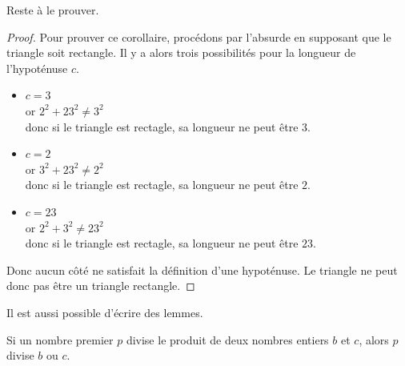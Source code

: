 \documentclass[francais,RandD]{rapportPFE}
\begin{document}
			Reste à le prouver.
			\begin{proof}
				Pour prouver ce corollaire, procédons par l'absurde en supposant que le triangle soit rectangle. Il y a alors trois possibilités pour la longueur de l'hypoténuse $c$.
				\begin{itemize}
					\item $c=3$\\
					or $2^{2}+ 23^{2} \neq 3^{2}$\\
					donc si le triangle est rectagle, sa longueur ne peut être $3$.
					\item $c=2$\\
					or $3^{2}+ 23^{2} \neq 2^{2}$\\
					donc si le triangle est rectagle, sa longueur ne peut être $2$.
					\item $c=23$\\
					or $2^{2}+ 3^{2} \neq 23^{2}$\\
					donc si le triangle est rectagle, sa longueur ne peut être $23$.
				\end{itemize}
				Donc aucun côté ne satisfait la définition d'une hypoténuse. Le triangle ne peut donc pas être un triangle rectangle.
			\end{proof}
			Il est aussi possible d'écrire des lemmes.

			\begin{Lemma}
				\label{lem:Euclide}
				Si un nombre premier $p$ divise le produit de deux nombres entiers $b$ et $c$, alors $p$ divise $b$ ou $c$.
			\end{Lemma}
\end{document}
